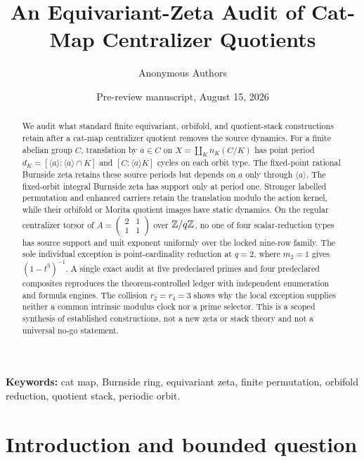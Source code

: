 \documentclass[11pt]{article}
\title{An Equivariant-Zeta Audit of Cat-Map Centralizer Quotients}
\author{Anonymous Authors}
\date{Pre-review manuscript, August 15, 2026}
\theoremstyle{definition}
\theoremstyle{remark}
\begin{document}
\maketitle

\begin{abstract}
We audit what standard finite equivariant, orbifold, and quotient-stack
constructions retain after a cat-map centralizer quotient removes the source
dynamics.  For a finite abelian group \(C\), translation by \(a\in C\) on
\(X=\coprod_K n_K(C/K)\) has point period
\(d_K=[\langle a\rangle:\langle a\rangle\cap K]\) and
\([C:\langle a\rangle K]\) cycles on each orbit type.  The fixed-point
rational Burnside zeta retains these source periods but depends on \(a\) only
through \(\langle a\rangle\).  The fixed-orbit integral Burnside zeta has
support only at period one.  Stronger labelled permutation and enhanced
carriers retain the translation modulo the action kernel, while their
orbifold or Morita quotient images have static dynamics.  On the regular
centralizer torsor of
\(A=\left(\begin{smallmatrix}2&1\\1&1\end{smallmatrix}\right)\) over
\(\mathbb{Z}/q\mathbb{Z}\), no one of four scalar-reduction types has source support and
unit exponent uniformly over the locked nine-row family.  The sole
individual exception is point-cardinality reduction at \(q=2\), where
\(m_2=1\) gives \((1-t^3)^{-1}\).  A single exact audit at five
predeclared primes and four predeclared composites reproduces the
theorem-controlled ledger with independent enumeration and formula engines.
The collision \(r_2=r_4=3\) shows why the local exception supplies neither a
common intrinsic modulus clock nor a prime selector.  This is a scoped
synthesis of established constructions, not a new zeta or stack theory and
not a universal no-go statement.
\end{abstract}

\noindent\textbf{Keywords:} cat map, Burnside ring, equivariant zeta,
finite permutation, orbifold reduction, quotient stack, periodic orbit.

\section{Introduction and bounded question}
\label{sec:introduction}
\end{document}
